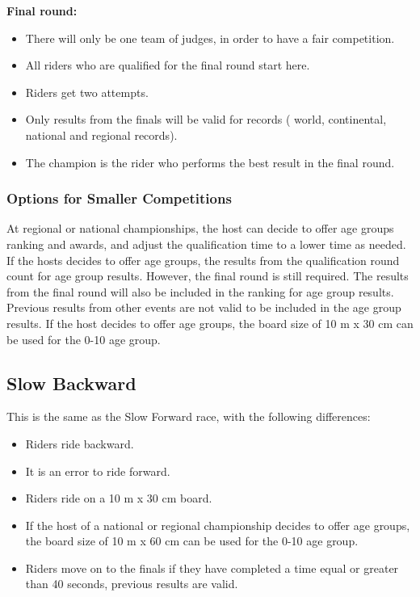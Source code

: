 \textbf{Final round:}
\begin{itemize}
\item There will only be one team of judges, in order to have a fair competition. 
\item All riders who are qualified for the final round start here.
\item Riders get two attempts.
\item Only results from the finals will be valid for records ( world, continental, national and regional records).
\item The champion is the rider who performs the best result in the final round.
\end{itemize}

\subsubsection{Options for Smaller Competitions}
At regional or national championships, the host can decide to offer age groups ranking and awards, and adjust the qualification time to a lower time as needed.
If the hosts decides to offer age groups, the results from the qualification round count for age group results.
However, the final round is still required.
The results from the final round will also be included in the ranking for age group results.
Previous results from other events are not valid to be included in the age group results.
If the host decides to offer age groups, the board size of 10 m x 30 cm can be used for the 0-10 age group.

\subsection{Slow Backward}
This is the same as the Slow Forward race, with the following differences:
\begin{itemize}
\item Riders ride backward.
\item It is an error to ride forward.
\item Riders ride on a 10 m x 30 cm board.
\item If the host of a national or regional championship decides to offer age groups, the board size of 10 m x 60 cm can be used for the 0-10 age group.
\item Riders move on to the finals if they have completed a time equal or greater than 40 seconds, previous results are valid.
\end{itemize}

